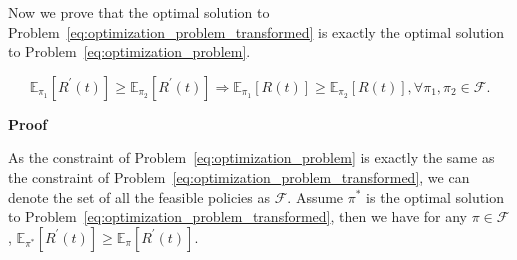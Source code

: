 \documentclass[12pt, a4paper]{article}
\begin{document}
Now we prove that the optimal solution to Problem~\ref{eq:optimization_problem_transformed} is exactly the optimal solution to Problem~\ref{eq:optimization_problem}.

\[
\mathbb{E}_{\pi_1} \left[ R^' (t) \right] \ge \mathbb{E}_{\pi_2} \left[ R^' (t) \right] \Rightarrow \mathbb{E}_{\pi_1} \left[ R (t) \right] \ge \mathbb{E}_{\pi_2} \left[ R (t) \right], \forall \pi_1, \pi_2 \in \mathcal{F}.
\]

\textbf{Proof}

As the constraint of Problem~\eqref{eq:optimization_problem} is exactly the same as the constraint of Problem~\eqref{eq:optimization_problem_transformed}, we can denote the set of all the feasible policies as $\mathcal{F}$. Assume $\pi^*$ is the optimal solution to Problem~\ref{eq:optimization_problem_transformed}, then we have for any $\pi \in \mathcal{F}$, $\mathbb{E}_{\pi^*} \left[ R^' (t) \right] \ge \mathbb{E}_{\pi} \left[ R^' (t) \right]$.
\end{document}
